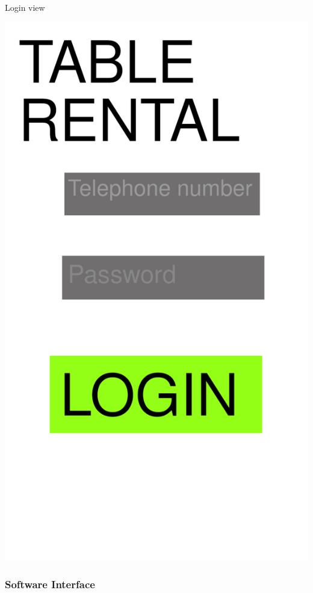 \documentclass[14pt]{extarticle}
\begin{document}
\begin{minipage}{\textwidth}

{\huge Login view}

\includegraphics[width=\textwidth]{mock3.png}

\end{minipage}


\subsubsection{Software Interface}
\end{document}

